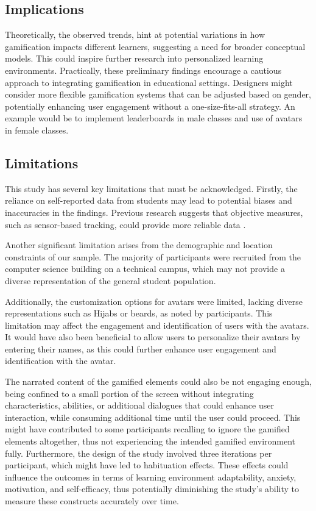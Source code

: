 \subsection{Implications}
Theoretically, the observed trends, hint at potential variations in how gamification impacts different learners, suggesting a need for broader conceptual models.
This could inspire further research into personalized learning environments.
Practically, these preliminary findings encourage a cautious approach to integrating gamification in educational settings.
Designers might consider more flexible gamification systems that can be adjusted based on gender, potentially enhancing user engagement without a one-size-fits-all strategy.
An example would be to implement leaderboards in male classes and use of avatars in female classes.


\subsection{Limitations}
This study has several key limitations that must be acknowledged.
Firstly, the reliance on self-reported data from students may lead to potential biases and inaccuracies in the findings. Previous research suggests that objective measures, such as sensor-based tracking, could provide more reliable data \parencite{woolfAffectiveTutorsAutomatic2010}.

Another significant limitation arises from the demographic and location constraints of our sample. The majority of participants were recruited from the computer science building on a technical campus, which may not provide a diverse representation of the general student population.

Additionally, the customization options for avatars were limited, lacking diverse representations such as Hijabs or beards, as noted by participants. This limitation may affect the engagement and identification of users with the avatars. It would have also been beneficial to allow users to personalize their avatars by entering their names, as this could further enhance user engagement and identification with the avatar.

The narrated content of the gamified elements could also be not engaging enough, being confined to a small portion of the screen without integrating characteristics, abilities, or additional dialogues that could enhance user interaction, while consuming additional time until the user could proceed. This might have contributed to some participants recalling to ignore the gamified elements altogether, thus not experiencing the intended gamified environment fully.
Furthermore, the design of the study involved three iterations per participant, which might have led to habituation effects. These effects could influence the outcomes in terms of learning environment adaptability, anxiety, motivation, and self-efficacy, thus potentially diminishing the study's ability to measure these constructs accurately over time.


